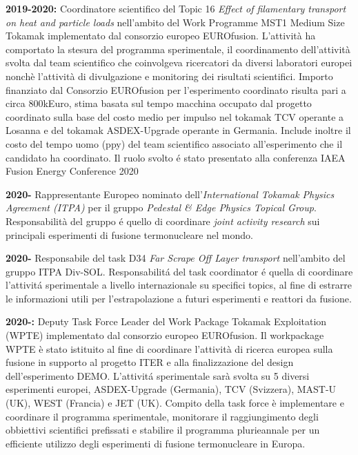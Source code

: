 \begin{enumerate}[label={[E\arabic*]}]
\item \textbf{2019-2020:} Coordinatore scientifico del Topic 16
  \emph{Effect of filamentary transport on heat and particle loads }
  nell'ambito del Work Programme MST1 Medium Size Tokamak implementato
  dal consorzio europeo EUROfusion. L'attivit{\`a} ha comportato la
  stesura del programma sperimentale, il coordinamento
  dell'attivit{\`a} svolta dal team scientifico che coinvolgeva
  ricercatori da diversi laboratori europei nonch{\`e} l'attivit{\`a}
  di divulgazione e monitoring dei risultati scientifici.  Importo
  finanziato dal Consorzio EUROfusion per l'esperimento coordinato
  risulta pari a circa 800kEuro, stima basata sul tempo macchina
  occupato dal progetto coordinato sulla base del costo medio per
  impulso nel tokamak TCV operante a Losanna e del tokamak
  ASDEX-Upgrade operante in Germania.  Include inoltre il costo del
  tempo uomo (ppy) del team scientifico associato all’esperimento che
  il candidato ha coordinato. Il ruolo svolto \'e stato presentato
  alla conferenza IAEA Fusion Energy Conference 2020 \cite{vianello:iaea2021sol, henderson:iaea2020experimental}
%
\item \textbf{2020-} Rappresentante Europeo nominato
  dell'\emph{International Tokamak Physics Agreement (ITPA)} per il
  gruppo \emph{Pedestal \& Edge Physics Topical
    Group}. Responsabilit\`a del gruppo \'e quello di coordinare
  \emph{joint activity research } sui principali esperimenti di
  fusione termonucleare nel mondo.
%
\item \textbf{2020-} Responsabile del task D34 \emph{Far Scrape Off
    Layer transport} nell'ambito del gruppo ITPA
  Div-SOL. Responsabilit\'a del task coordinator \'e quella di
  coordinare l'attivit\'a sperimentale a livello internazionale su
  specifici topics,  al fine di estrarre le informazioni utili per
  l'estrapolazione a futuri esperimenti e reattori da fusione.
%
\item \textbf{2020-:} Deputy Task Force Leader del Work Package
  Tokamak Exploitation (WPTE) implementato dal consorzio europeo
  EUROfusion.  Il workpackage WPTE \`e stato istituito al fine di
  coordinare l'attivit\`a di ricerca europea sulla fusione in supporto
  al progetto ITER e alla finalizzazione del design dell'esperimento
  DEMO. L'attivit\'a sperimentale sar\`a svolta su 5 diversi
  esperimenti europei, ASDEX-Upgrade (Germania), TCV (Svizzera),
  MAST-U (UK), WEST (Francia) e JET (UK). Compito della task force \`e
  implementare e coordinare il programma sperimentale, monitorare il
  raggiungimento degli obbiettivi scientifici prefissati e stabilire
  il programma plurieannale per un efficiente utilizzo degli
  esperimenti di fusione termonucleare in Europa.


\end{enumerate}
